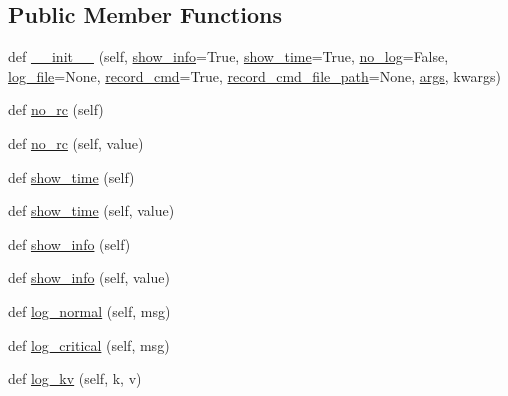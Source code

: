 \subsection*{Public Member Functions}
\begin{DoxyCompactItemize}
\item 
def \hyperlink{classsylva_1_1misc_1_1exec_1_1_s_y_l_v_a_aaab766c5bcef348c46052e70a1066105}{\+\_\+\+\_\+init\+\_\+\+\_\+} (self, \hyperlink{classsylva_1_1misc_1_1exec_1_1_s_y_l_v_a_a9a267f9d05fa98ca49fbfc5e049184a1}{show\+\_\+info}=True, \hyperlink{classsylva_1_1misc_1_1exec_1_1_s_y_l_v_a_a9b9a7b62a11ddea03dc98a441e0cfb0a}{show\+\_\+time}=True, \hyperlink{classsylva_1_1misc_1_1exec_1_1_s_y_l_v_a_a4ce3a2f4a4bc39adf1cf5f40830e5a83}{no\+\_\+log}=False, \hyperlink{classsylva_1_1misc_1_1exec_1_1_s_y_l_v_a_a0a00f9025fed04a0b679266e162d920a}{log\+\_\+file}=None, \hyperlink{classsylva_1_1misc_1_1exec_1_1_s_y_l_v_a_afca36696c160ab349df57221283ac5ca}{record\+\_\+cmd}=True, \hyperlink{classsylva_1_1misc_1_1exec_1_1_s_y_l_v_a_a88d289f3e8cebe556cc7995c24fc7e21}{record\+\_\+cmd\+\_\+file\+\_\+path}=None, \hyperlink{namespacesylva_1_1misc_1_1exec_a4e70593929af3f6aa7fa94d0b4318766}{args}, kwargs)
\item 
def \hyperlink{classsylva_1_1misc_1_1exec_1_1_s_y_l_v_a_a689ffc2470814b85264167e77517c1e6}{no\+\_\+rc} (self)
\item 
def \hyperlink{classsylva_1_1misc_1_1exec_1_1_s_y_l_v_a_a9e269e725cc5f5211d886a5b9608a089}{no\+\_\+rc} (self, value)
\item 
def \hyperlink{classsylva_1_1misc_1_1exec_1_1_s_y_l_v_a_aa97ba1b0b460019562d0b822f1c10398}{show\+\_\+time} (self)
\item 
def \hyperlink{classsylva_1_1misc_1_1exec_1_1_s_y_l_v_a_abb74332dd1f03c16134957f1e792cb60}{show\+\_\+time} (self, value)
\item 
def \hyperlink{classsylva_1_1misc_1_1exec_1_1_s_y_l_v_a_afb708ba8dd6289db279d8a9ab09cd1b5}{show\+\_\+info} (self)
\item 
def \hyperlink{classsylva_1_1misc_1_1exec_1_1_s_y_l_v_a_aa804346f551306b51131cb68194e8c71}{show\+\_\+info} (self, value)
\item 
def \hyperlink{classsylva_1_1misc_1_1exec_1_1_s_y_l_v_a_a6aec517802adb215a4b47d9149f63944}{log\+\_\+normal} (self, msg)
\item 
def \hyperlink{classsylva_1_1misc_1_1exec_1_1_s_y_l_v_a_a1eb3697e042c8566d384d6f4d134a94c}{log\+\_\+critical} (self, msg)
\item 
def \hyperlink{classsylva_1_1misc_1_1exec_1_1_s_y_l_v_a_a35d5e12cc1b330cff11424aed9a96f95}{log\+\_\+kv} (self, k, v)

\end{DoxyCompactItemize}
